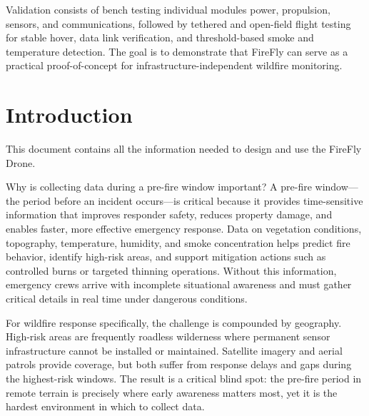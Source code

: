 \documentclass[journal, onecolumn]{IEEEtran}
\begin{document}
\vspace{0.5em}

Validation consists of bench testing individual modules power, propulsion,
sensors, and communications, followed by tethered and open-field flight
testing for stable hover, data link verification, and threshold-based smoke
and temperature detection. The goal is to demonstrate that FireFly can serve
as a practical proof-of-concept for infrastructure-independent wildfire
monitoring.

\clearpage

\section{Introduction}

This document contains all the information needed to design and use the FireFly Drone.

\vspace{1em}

Why is collecting data during a pre-fire window important? A pre-fire window---the period before an incident occurs---is critical because it provides time-sensitive information that improves responder safety, reduces property damage, and enables faster, more effective emergency response. Data on vegetation conditions, topography, temperature, humidity, and smoke concentration helps predict fire behavior, identify high-risk areas, and support mitigation actions such as controlled burns or targeted thinning operations. Without this information, emergency crews arrive with incomplete situational awareness and must gather critical details in real time under dangerous conditions.

\vspace{1em}

For wildfire response specifically, the challenge is compounded by geography. High-risk areas are frequently roadless wilderness where permanent sensor infrastructure cannot be installed or maintained. Satellite imagery and aerial patrols provide coverage, but both suffer from response delays and gaps during the highest-risk windows. The result is a critical blind spot: the pre-fire period in remote terrain is precisely where early awareness matters most, yet it is the hardest environment in which to collect data.

\vspace{1em}
\end{document}
